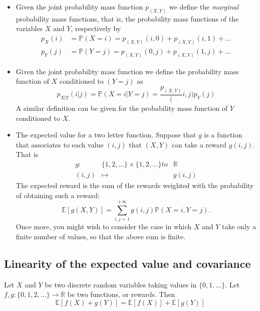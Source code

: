 \begin{itemize}
        \item Given the joint probability mass function $p_{(X,Y)}$ we define the \emph{marginal} probability mass functions, that is, the probability mass functions of the variables $X$ and $Y$, respectively by 
        \begin{equation}
            \begin{split}
            p_X(i) & = \mathbb P(X = i ) = p_{(X,Y)}(i,0) + p_{(X,Y)}(i,1) + ... \\
            p_Y(j) & = \mathbb P(Y = j ) = p_{(X,Y)}(0,j) + p_{(X,Y)}(1,j) + ... 
            \end{split}
        \end{equation}

        \item Given the joint probability mass function we define the probability mass function of $X$ conditioned to $( Y = j )$ as 
        \begin{equation}
            p_{X| Y }(i |j) = \mathbb P( X = i | Y = j) = \frac{p_{(X,Y)}}(i,j){p_Y(j)}  
        \end{equation}
    A similar definition can be given for the probability mass function of $Y$ conditioned to $X$.

    \item The expected value for a two letter function. Suppose that $g$ is a function that associates to each value $(i,j)$ that $(X,Y)$ can take  a reward $g(i,j)$. That is 
        \begin{equation}
        \label{e:expected}
            \begin{array}{ccc}
            g: & \{1,2,...\}\times \{1,2,...\}  to & \mathbb R \\
            (i,j) & \mapsto & g(i,j)
            \end{array}
        \end{equation}
        The expected reward is the sum of the rewards weighted with the probability of obtaining such a reward: 
        \begin{equation}
            \mathbb E[g(X,Y)] = \sum_{i,j= 1 }^{+\infty} g(i,j) \mathbb P(X = i, Y = j). 
        \end{equation}
        Once more, you might wish to consider the case in which $X$ and $Y$ take only a finite number of values, so that the above sum is finite. 
\end{itemize}

\subsection{Linearity of the expected value  and covariance}
\begin{proposition}
    Let $X$ and $Y$ be two discrete random variables taking values in $\{0,1,...\}$. Let $f,g:\{0,1,2,...\}\to \mathbb R $ be two functions, or rewards. Then  
    \begin{equation}
    \mathbb E[f(X) + g(Y)] = \mathbb E[f(X)] + \mathbb E[g(Y)]
    \end{equation}
\end{proposition}

